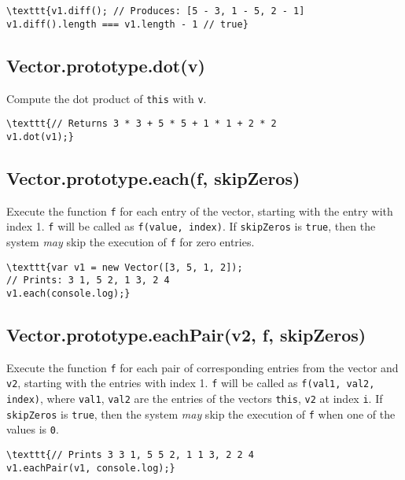 \documentclass{article}
\begin{document}
\begin{lstlisting}
\texttt{v1.diff(); // Produces: [5 - 3, 1 - 5, 2 - 1]
v1.diff().length === v1.length - 1 // true}\end{lstlisting}

    \subsection*{Vector.prototype.dot(v)}
    Compute the dot product of \texttt{this} with \texttt{v}.


\begin{lstlisting}
\texttt{// Returns 3 * 3 + 5 * 5 + 1 * 1 + 2 * 2
v1.dot(v1);}\end{lstlisting}

    \subsection*{Vector.prototype.each(f, skipZeros)}
    Execute the function \texttt{f} for each entry of the vector,
starting with the entry with index 1. \texttt{f} will be called as \texttt{f(value, index)}.
If \texttt{skipZeros} is \texttt{true}, then the system \emph{may} skip the execution
of \texttt{f} for zero entries.


\begin{lstlisting}
\texttt{var v1 = new Vector([3, 5, 1, 2]);
// Prints: 3 1, 5 2, 1 3, 2 4
v1.each(console.log);}\end{lstlisting}

    \subsection*{Vector.prototype.eachPair(v2, f, skipZeros)}
    Execute the function \texttt{f} for each pair of corresponding entries from the
vector and \texttt{v2}, starting with the entries with index 1.
\texttt{f} will be called as \texttt{f(val1, val2, index)}, where \texttt{val1}, \texttt{val2}
are the entries of the vectors \texttt{this}, \texttt{v2} at index \texttt{i}.
If \texttt{skipZeros} is \texttt{true}, then the system \emph{may} skip the execution of \texttt{f} when
one of the values is \texttt{0}.


\begin{lstlisting}
\texttt{// Prints 3 3 1, 5 5 2, 1 1 3, 2 2 4
v1.eachPair(v1, console.log);}\end{lstlisting}
\end{document}
